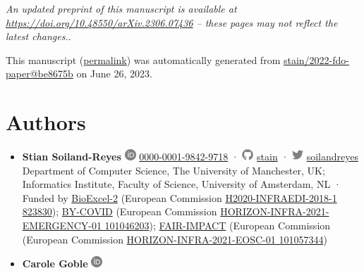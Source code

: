 \emph{An updated preprint of this manuscript is available at \url{https://doi.org/10.48550/arXiv.2306.07436}
-- these pages may not reflect the latest changes.}.

This manuscript
(\href{https://stain.github.io/2022-fdo-paper/v/be8675b6907eabfc339d356014312f2b2aa8292e/}{permalink})
was automatically generated
from \href{https://github.com/stain/2022-fdo-paper/tree/be8675b6907eabfc339d356014312f2b2aa8292e}{stain/2022-fdo-paper@be8675b}
on June 26, 2023.

\hypertarget{authors}{%
\section*{Authors}\label{authors}}

\begin{itemize}
\item
  \textbf{Stian Soiland-Reyes}
  \includegraphics[width=0.16667in,height=0.16667in]{images/orcid.svg}
  \href{https://orcid.org/0000-0001-9842-9718}{0000-0001-9842-9718}
  · \includegraphics[width=0.16667in,height=0.16667in]{images/github.svg}
  \href{https://github.com/stain}{stain}
  · \includegraphics[width=0.16667in,height=0.16667in]{images/twitter.svg}
  \href{https://twitter.com/soilandreyes}{soilandreyes}
  Department of Computer Science, The University of Manchester, UK; Informatics Institute, Faculty of Science, University of Amsterdam, NL
  · Funded by \href{https://bioexcel.eu/}{BioExcel-2} (European Commission \href{https://cordis.europa.eu/project/id/823830}{H2020-INFRAEDI-2018-1 823830}); \href{https://by-covid.eu/}{BY-COVID} (European Commission \href{https://cordis.europa.eu/project/id/101046203}{HORIZON-INFRA-2021-EMERGENCY-01 101046203}); \href{http://www.fair-impact.eu/}{FAIR-IMPACT} (European Commission (European Commission \href{https://cordis.europa.eu/project/id/101057344}{HORIZON-INFRA-2021-EOSC-01 101057344})
\item
  \textbf{Carole Goble}
  \includegraphics[width=0.16667in,height=0.16667in]{images/orcid.svg}

\end{itemize}
